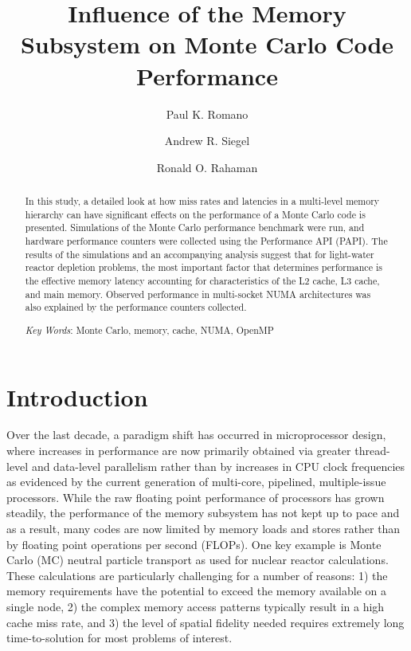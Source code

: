 \documentclass{mc2015}
\begin{document}
\title{Influence of the Memory Subsystem on Monte Carlo Code Performance}

\author{Paul K. Romano}

\author{Andrew R. Siegel}
\author{Ronald O. Rahaman}

\maketitle

\begin{abstract}
In this study, a detailed look at how miss rates and latencies in a multi-level
memory hierarchy can have significant effects on the performance of a Monte
Carlo code is presented. Simulations of the Monte Carlo performance benchmark
were run, and hardware performance counters were collected using the
Performance API (PAPI). The results of the simulations and an accompanying
analysis suggest that for light-water reactor depletion problems, the most
important factor that determines performance is the effective memory latency
accounting for characteristics of the L2 cache, L3 cache, and main
memory. Observed performance in multi-socket NUMA architectures was also
explained by the performance counters collected.

\emph{Key Words}: Monte Carlo, memory, cache, NUMA, OpenMP
\end{abstract}

\section{Introduction}

Over the last decade, a paradigm shift has occurred in microprocessor design,
where increases in performance are now primarily obtained via greater
thread-level and data-level parallelism rather than by increases in CPU clock
frequencies as evidenced by the current generation of multi-core, pipelined,
multiple-issue processors. While the raw floating point performance of
processors has grown steadily, the performance of the memory subsystem has not
kept up to pace and as a result, many codes are now limited by memory loads and
stores rather than by floating point operations per second (FLOPs). One key
example is Monte Carlo (MC) neutral particle transport as used for nuclear
reactor calculations. These calculations are particularly challenging for a
number of reasons: 1) the memory requirements have the potential to exceed the
memory available on a single node, 2) the complex memory access patterns
typically result in a high cache miss rate, and 3) the level of spatial
fidelity needed requires extremely long time-to-solution for most problems of
interest.
\end{document}
